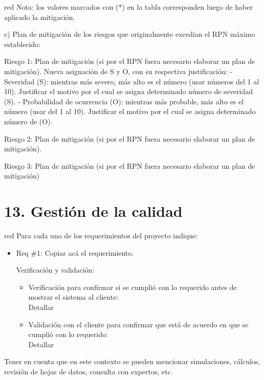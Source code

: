 \documentclass[11pt]{charter}
\begin{document}
\begin{consigna}{red}
Nota: los valores marcados con (*) en la tabla corresponden luego de haber aplicado la mitigación.

c) Plan de mitigación de los riesgos que originalmente excedían el RPN máximo establecido:
 
Riesgo 1: Plan de mitigación (si por el RPN fuera necesario elaborar un plan de mitigación).
  Nueva asignación de S y O, con su respectiva justificación:
  - Severidad (S): mientras más severo, más alto es el número (usar números del 1 al 10).
          Justificar el motivo por el cual se asigna determinado número de severidad (S).
  - Probabilidad de ocurrencia (O): mientras más probable, más alto es el número (usar del 1 al 10).
          Justificar el motivo por el cual se asigna determinado número de (O).

Riesgo 2: Plan de mitigación (si por el RPN fuera necesario elaborar un plan de mitigación).
 
Riesgo 3: Plan de mitigación (si por el RPN fuera necesario elaborar un plan de mitigación)

\end{consigna}


\section{13. Gestión de la calidad}
\label{sec:calidad}

\begin{consigna}{red}
Para cada uno de los requerimientos del proyecto indique:
\begin{itemize} 
\item Req \#1: Copiar acá el requerimiento.

Verificación y validación:

\begin{itemize}
\item Verificación para confirmar si se cumplió con lo requerido antes de mostrar el sistema al cliente:\\
Detallar 
\item Validación con el cliente para confirmar que está de acuerdo en que se cumplió con lo requerido:\\
Detallar  
\end{itemize}

\end{itemize}

Tener en cuenta que en este contexto se pueden mencionar simulaciones, cálculos, revisión de hojas de datos, consulta con expertos, etc.

\end{consigna}
\end{document}
